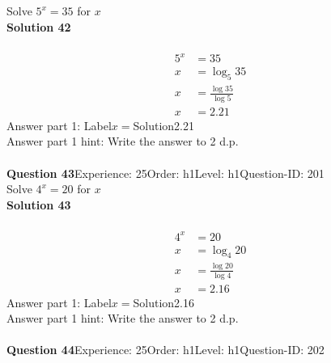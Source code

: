 \documentclass{article}
\begin{document}
Solve $5^x=35$ for $x$\\[4pt]
\noindent\textbf{Solution 42}\\[2pt]
\\[-35pt]\begin{align*}
5^x&=35\\[2pt]
x&=\log_{5}35\\[2pt]
x&=\displaystyle\frac{\log35}{\log5}\\[2pt]
x&=2.21
\end{align*}
Answer part 1: \hspace{10pt}Label\hspace{10pt}$x=$\hspace{10pt}Solution\hspace{10pt}2.21\\
Answer part 1 hint: \hspace{15pt}Write the answer to 2 d.p.\\
\\[4pt]
\noindent\textbf{Question 43}\hspace{20pt}Experience: 25\hspace{20pt}Order: h1\hspace{20pt}Level: h1\hspace{20pt}Question-ID: 201\\[2pt]
Solve $4^x=20$ for $x$\\[4pt]
\noindent\textbf{Solution 43}\\[2pt]
\\[-35pt]\begin{align*}
4^x&=20\\[2pt]
x&=\log_{4}20\\[2pt]
x&=\displaystyle\frac{\log20}{\log4}\\[2pt]
x&=2.16
\end{align*}
Answer part 1: \hspace{10pt}Label\hspace{10pt}$x=$\hspace{10pt}Solution\hspace{10pt}2.16\\
Answer part 1 hint: \hspace{15pt}Write the answer to 2 d.p.\\
\\[4pt]
\noindent\textbf{Question 44}\hspace{20pt}Experience: 25\hspace{20pt}Order: h1\hspace{20pt}Level: h1\hspace{20pt}Question-ID: 202\\[2pt]
\end{document}
